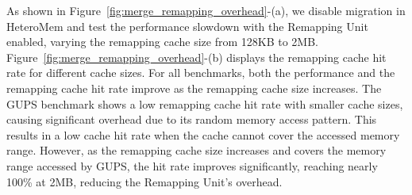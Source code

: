 As shown in Figure~\ref{fig:merge_remapping_overhead}-(a), we disable migration in HeteroMem and test the performance slowdown with the Remapping Unit enabled, varying the remapping cache size from 128KB to 2MB.
Figure~\ref{fig:merge_remapping_overhead}-(b) displays the remapping cache hit rate for different cache sizes.
For all benchmarks, both the performance and the remapping cache hit rate improve as the remapping cache size increases. The GUPS benchmark shows a low remapping cache hit rate with smaller cache sizes, causing significant overhead due to its random memory access pattern. 
This results in a low cache hit rate when the cache cannot cover the accessed memory range. 
However, as the remapping cache size increases and covers the memory range accessed by GUPS, the hit rate improves significantly, reaching nearly 100\% at 2MB, reducing the Remapping Unit's overhead.
